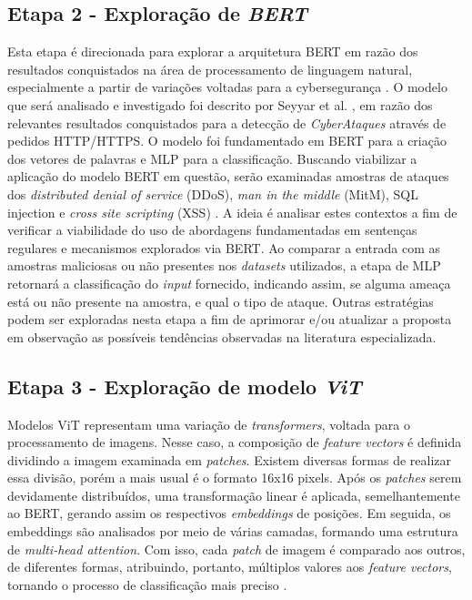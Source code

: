 \subsection{Etapa 2 - Exploração de \textit{BERT}}

Esta etapa é direcionada para explorar a arquitetura BERT em razão dos resultados conquistados na área de processamento de linguagem natural, especialmente a partir de variações voltadas para a cybersegurança \cite{ranade2021cybert}. O modelo que será analisado e investigado foi descrito por Seyyar et al. \cite{seyyar2022attack}, em razão dos relevantes resultados conquistados para a detecção de \textit{CyberAtaques} através de pedidos HTTP/HTTPS. O modelo foi fundamentado em BERT para a criação dos vetores de palavras e MLP para a classificação. Buscando viabilizar a aplicação do modelo BERT em questão, serão examinadas amostras de ataques dos \textit{distributed denial of service} (DDoS), \textit{man in the middle} (MitM), SQL injection e \textit{cross site scripting} (XSS) \cite{luxemburk2021detection}. A ideia é analisar estes contextos a fim de verificar a viabilidade do uso de abordagens fundamentadas em sentenças regulares e mecanismos explorados via BERT. Ao comparar a entrada com as amostras maliciosas ou não presentes nos \textit{datasets} utilizados, a etapa de MLP retornará a classificação do \textit{input} fornecido, indicando assim, se alguma ameaça está ou não presente na amostra, e qual o tipo de ataque. Outras estratégias podem ser exploradas nesta etapa a fim de aprimorar e/ou atualizar a proposta em observação as possíveis tendências observadas na literatura especializada.  

\subsection{Etapa 3 - Exploração de modelo \textit{ViT}}
    
Modelos ViT representam uma variação de \textit{transformers}, voltada para o processamento de imagens. Nesse caso, a composição de \textit{feature vectors} é definida dividindo a imagem examinada em \textit{patches}. Existem diversas formas de realizar essa divisão, porém a mais usual é o formato 16x16 pixels. Após os \textit{patches} serem devidamente distribuídos, uma transformação linear é aplicada, semelhantemente ao BERT, gerando assim os respectivos \textit{embeddings} de posições. Em seguida, os embeddings são analisados por meio de várias camadas, formando uma estrutura de \textit{multi-head attention}. Com isso, cada \textit{patch} de imagem é comparado aos outros, de diferentes formas, atribuindo, portanto, múltiplos valores aos \textit{feature vectors}, tornando o processo de classificação mais preciso \cite{dosovitskiy2020}.

